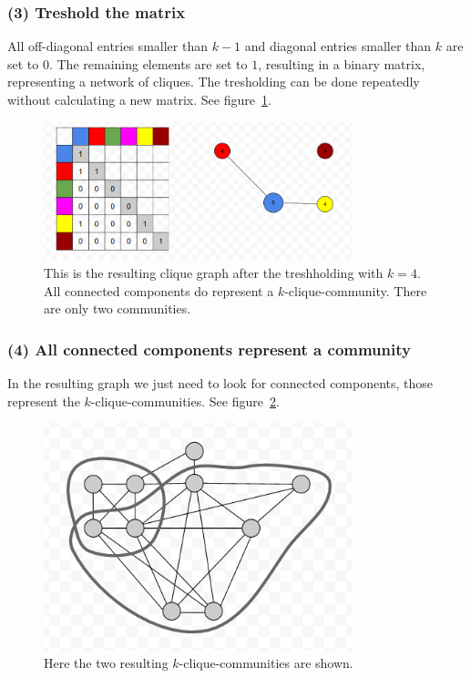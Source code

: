 \documentclass[runningheads,a4paper]{llncs}
\begin{document}
\subsubsection{(3) Treshold the matrix}
All off-diagonal entries smaller than $k-1$ and diagonal entries smaller than $k$ are set to $0$.
The remaining elements are set to $1$, resulting in a binary matrix, representing a network of cliques. The tresholding can be done repeatedly without calculating a new matrix. See figure~\ref{fig:matrixtrashed}.

\begin{figure}
\begin{center}
	\includegraphics[width=0.8\textwidth]{matrixtrashed}
		\caption{This is the resulting clique graph after the treshholding with $k=4$. All connected components do represent a $k$-clique-community. There are only two communities.}
		\label{fig:matrixtrashed}
\end{center}
\end{figure}
 
\subsubsection{(4) All connected components represent a community}
In the resulting graph we just need to look for connected components, those represent the $k$-clique-communities. See figure~\ref{fig:result}.

\begin{figure}
\begin{center}
	\includegraphics[width=0.8\textwidth]{result}
		\caption{Here the two resulting $k$-clique-communities are shown.}
		\label{fig:result}
\end{center}
\end{figure}
\end{document}
